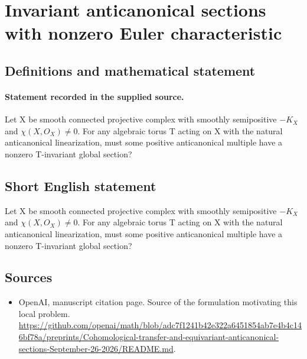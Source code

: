 \documentclass[11pt]{article}
\begin{document}
\section*{Invariant anticanonical sections with nonzero Euler characteristic}\label{statement}
\subsection{Definitions and mathematical statement}
\paragraph{Statement recorded in the supplied source.}
Let X be smooth connected projective complex with smoothly semipositive $-K_X$ and $\chi (X,O_X)\neq 0$. For any algebraic torus T acting on X with the natural anticanonical linearization, must some positive anticanonical multiple have a nonzero T-invariant global section?
\subsection{Short English statement}
Let X be smooth connected projective complex with smoothly semipositive $-K_X$ and $\chi (X,O_X)\neq 0$. For any algebraic torus T acting on X with the natural anticanonical linearization, must some positive anticanonical multiple have a nonzero T-invariant global section?
\subsection{Sources}
\begin{itemize}
\item[S1] OpenAI, manuscript citation page. Source of the formulation motivating this local problem.
\url{https://github.com/openai/math/blob/adc7f1241b42e322a6451854ab7e4b4c146bf78a/preprints/Cohomological-transfer-and-equivariant-anticanonical-sections-September-26-2026/README.md}.
\end{itemize}
\end{document}
